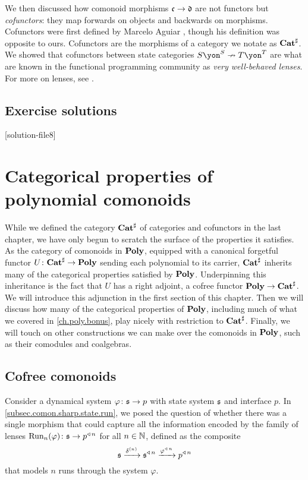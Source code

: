 \documentclass[Book-Poly]{subfiles}
\begin{document}
We then discussed how comonoid morphisms $\mathfrak{c}\to\mathfrak{d}$ are not functors but \emph{cofunctors}: they map forwards on objects and backwards on morphisms. Cofunctors were first defined by Marcelo Aguiar \cite{aguiar1997internal}, though his definition was opposite to ours. Cofunctors are the morphisms of a category we notate as $\mathbf{Cat}^\sharp$. We showed that cofunctors between state categories $S\yon^S\cof T\yon^T$ are what are known in the functional programming community as \emph{very well-behaved lenses}. For more on lenses, see \cite{nlab2022lens}.


\section{Exercise solutions}
{\footnotesize
}

[solution-file8]

\chapter{Categorical properties of polynomial comonoids} \label{ch.comon.cofree}

While we defined the category $\mathbf{Cat}^\sharp$ of categories and cofunctors in the last chapter, we have only begun to scratch the surface of the properties it satisfies.
As the category of comonoids in $\mathbf{Poly}$, equipped with a canonical forgetful functor $U\colon\mathbf{Cat}^\sharp\to\mathbf{Poly}$ sending each polynomial to its carrier, $\mathbf{Cat}^\sharp$ inherits many of the categorical properties satisfied by $\mathbf{Poly}$.
Underpinning this inheritance is the fact that $U$ has a right adjoint, a cofree functor $\mathbf{Poly}\to\mathbf{Cat}^\sharp$.
We will introduce this adjunction in the first section of this chapter.
Then we will discuss how many of the categorical properties of $\mathbf{Poly}$, including much of what we covered in \cref{ch.poly.bonus}, play nicely with restriction to $\mathbf{Cat}^\sharp$.
Finally, we will touch on other constructions we can make over the comonoids in $\mathbf{Poly}$, such as their comodules and coalgebras.

\section{Cofree comonoids} \label{sec.comon.cofree.cons}

Consider a dynamical system $\varphi\colon\mathfrak{s}\to p$ with state system $\mathfrak{s}$ and interface $p$.
In \cref{subsec.comon.sharp.state.run}, we posed the question of whether there was a single morphism that could capture all the information encoded by the family of lenses $\text{Run}_n(\varphi)\colon\mathfrak{s}\to p^{\mathbin{\triangleleft}\,n}$ for all $n\in\mathbb{N}$, defined as the composite
\[
    \mathfrak{s}\xrightarrow{\delta^{(n)}}\mathfrak{s}^{\mathbin{\triangleleft}\,n}\xrightarrow{\varphi^{\mathbin{\triangleleft}\,n}}p^{\mathbin{\triangleleft}\,n}
\]
that models $n$ runs through the system $\varphi$.
\end{document}
